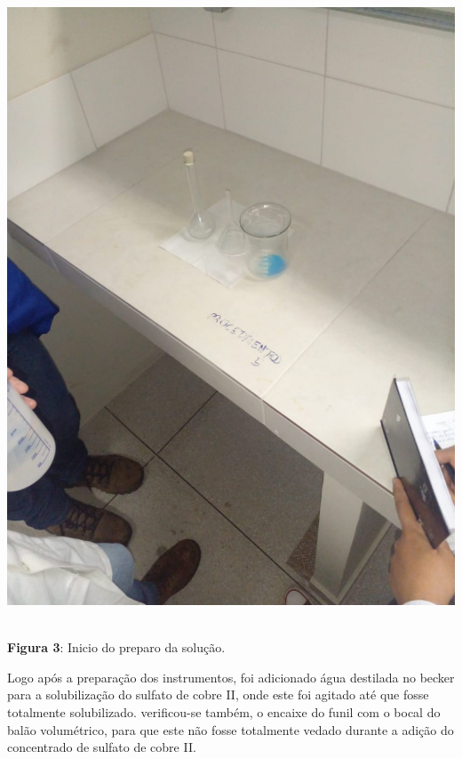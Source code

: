 \documentclass[a4paper, 11pt]{article}
\begin{document}
        \begin{center}
            \parbox{7cm}{\includegraphics[scale=0.2]{01. instrumentos utilizados.jpeg}}\\
            \singlespacing
            \textbf{Figura 3}: Inicio do preparo da solução\@.
        \end{center}
        \doublespacing

        \indent Logo após a preparação dos instrumentos, foi adicionado água destilada no becker para a solubilização do sulfato de cobre II,
        onde este foi agitado até que fosse totalmente solubilizado\@.
        verificou-se também, o encaixe do funil com o bocal do balão volumétrico, para que este não fosse totalmente vedado durante a
        adição do concentrado de sulfato de cobre II\@.\\
\end{document}
